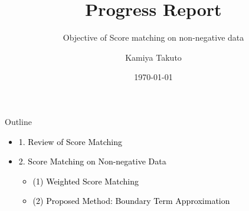 \documentclass[aspectratio=169]{beamer}
\title{Progress Report}
\subtitle{Objective of Score matching on non-negative data}
\author{Kamiya Takuto}
\date{\today}
\begin{document}
\begin{frame}
  \titlepage
\end{frame}
\begin{frame}{Outline}

\begin{itemize}
  \item \textcolor{black}{1. Review of Score Matching}
  \vspace{0.5em}
  \item \textcolor{black}{2. Score Matching on Non-negative Data}
  \begin{itemize}
    \item \textcolor{black}{(1) Weighted Score Matching}
    \item \textcolor{black}{(2) Proposed Method: Boundary Term Approximation}
  \end{itemize}
\end{itemize}

\end{frame}
\end{document}
